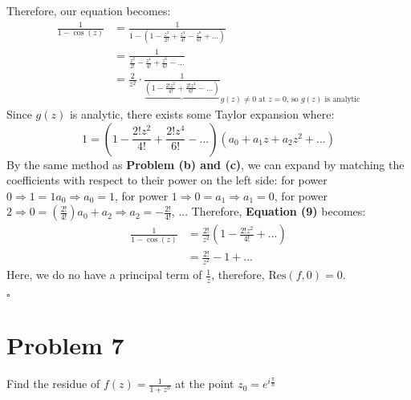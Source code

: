 \documentclass[11pt]{article}
\newenvironment{proof}{\noindent{\bf Proof.}}{\hfill $\square$\medskip}
\begin{document}
\begin{proof}
\begin{enumerate}[label=\textbf{(\alph*)}]
        Therefore, our equation becomes:
        \begin{equation}
            \begin{split}
                \frac{1}{1-\cos(z)}&=\frac{1}{1-\left(1-\frac{z^{2}}{2!}+\frac{z^{4}}{4!}-\frac{z^{6}}{6!}+...\right)}\\
                &=\frac{1}{\frac{z^{2}}{2!}-\frac{z^{4}}{4!}+\frac{z^{6}}{6!}-...}\\
                &=\frac{2}{z^{2}}\cdot\frac{1}{\underbrace{\left(1-\frac{2!z^{2}}{4!}+\frac{2!z^{4}}{6!}-...\right)}}_\text{$g(z)\neq0$ at $z=0$, so $g(z)$ is analytic}
            \end{split}
        \end{equation}
        Since $g(z)$ is analytic, there exists some Taylor expansion where:
        $$1=\left(1-\frac{2!z^{2}}{4!}+\frac{2!z^{4}}{6!}-...\right)(a_{0}+a_{1}z+a_{2}z^{2}+...)$$
        By the same method as \textbf{Problem (b) and (c)}, we can expand by matching the coefficients with respect to their power on the left side: for power $0\Rightarrow 1=1a_{0}\Rightarrow a_{0}=1$, for power $1\Rightarrow 0=a_{1}\Rightarrow a_{1}=0$, for power $2\Rightarrow 0=\left(\frac{2!}{4!}\right)a_{0}+a_{2}\Rightarrow a_{2}=-\frac{2!}{4!}$, ...
        Therefore, \textbf{Equation (9)} becomes:
        \begin{equation}
            \begin{split}
                \frac{1}{1-\cos(z)}&=\frac{2!}{z^{2}}(1-\frac{2!z^{2}}{4!}+...)\\
                &=\frac{2!}{z^{2}}-1+...
            \end{split}
        \end{equation}
        Here, we do no have a principal term of $\frac{1}{z}$, therefore, $\text{Res}(f,0)=0$.
    \end{enumerate}
\end{proof}


\newpage
\section{Problem 7}
Find the residue of $f(z)=\frac{1}{1+z^{n}}$ at the point $z_{0}=e^{i\frac{\pi}{n}}$
\end{document}
